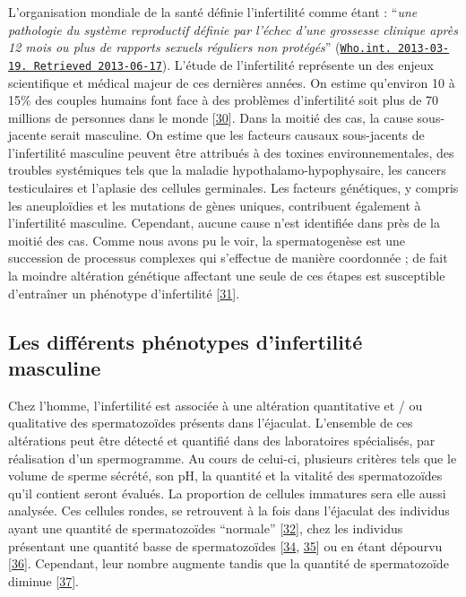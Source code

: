 \documentclass[12pt,twoside]{ugathesis}
\theoremstyle{definition}
\theoremstyle{definition}
\theoremstyle{remark}
\begin{document}
L'organisation mondiale de la santé définie l'infertilité comme étant :
``\emph{une pathologie du système reproductif définie par l'échec d'une
grossesse clinique après 12 mois ou plus de rapports sexuels réguliers
non protégés}''
(\href{http://www.who.int/reproductivehealth/topics/infertility/definitions/en/}{\texttt{Who.int.\ 2013-03-19.\ Retrieved\ 2013-06-17}}).
L'étude de l'infertilité représente un des enjeux scientifique et
médical majeur de ces dernières années. On estime qu'environ 10 à 15\%
des couples humains font face à des problèmes d'infertilité soit plus de
70 millions de personnes dans le monde
{[}\protect\hyperlink{ref-Boivin2007a}{30}{]}. Dans la moitié des cas,
la cause sous-jacente serait masculine. On estime que les facteurs
causaux sous-jacents de l'infertilité masculine peuvent être attribués à
des toxines environnementales, des troubles systémiques tels que la
maladie hypothalamo-hypophysaire, les cancers testiculaires et l'aplasie
des cellules germinales. Les facteurs génétiques, y compris les
aneuploïdies et les mutations de gènes uniques, contribuent également à
l'infertilité masculine. Cependant, aucune cause n'est identifiée dans
près de la moitié des cas. Comme nous avons pu le voir, la
spermatogenèse est une succession de processus complexes qui s'effectue
de manière coordonnée ; de fait la moindre altération génétique
affectant une seule de ces étapes est susceptible d'entraîner un
phénotype d'infertilité
{[}\protect\hyperlink{ref-Grudzinskas1995}{31}{]}.

\subsection{Les différents phénotypes d'infertilité
masculine}\label{les-differents-phenotypes-dinfertilite-masculine}

Chez l'homme, l'infertilité est associée à une altération quantitative
et / ou qualitative des spermatozoïdes présents dans l'éjaculat.
L'ensemble de ces altérations peut être détecté et quantifié dans des
laboratoires spécialisés, par réalisation d'un spermogramme. Au cours de
celui-ci, plusieurs critères tels que le volume de sperme sécrété, son
pH, la quantité et la vitalité des spermatozoïdes qu'il contient seront
évalués. La proportion de cellules immatures sera elle aussi analysée.
Ces cellules rondes, se retrouvent à la fois dans l'éjaculat des
individus ayant une quantité de spermatozoïdes ``normale''
{[}\protect\hyperlink{ref-Michael1937}{32}{]}, chez les individus
présentant une quantité basse de spermatozoïdes
{[}\protect\hyperlink{ref-MacLeod1970}{34},
\protect\hyperlink{ref-Tomlinson1993}{35}{]} ou en étant dépourvu
{[}\protect\hyperlink{ref-Kurilo}{36}{]}. Cependant, leur nombre
augmente tandis que la quantité de spermatozoïde diminue
{[}\protect\hyperlink{ref-SPERLING1971}{37}{]}.
\end{document}
